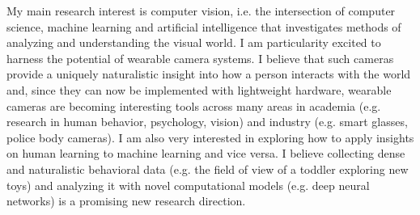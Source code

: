 \documentclass[10pt]{article}
\begin{document}




My main research interest is computer vision, i.e. the intersection of computer science, machine learning and artificial intelligence that investigates methods of analyzing and understanding the visual world.  I am particularity excited to harness the potential of wearable camera systems. I believe that such cameras provide a uniquely naturalistic insight into how a person interacts with the world and, since they can now be implemented with lightweight hardware, wearable cameras are becoming interesting tools across many areas in academia (e.g. research in human behavior, psychology, vision) and industry (e.g. smart glasses, police body cameras). I am also very interested in exploring how to apply insights on human learning to machine learning and vice versa. I believe collecting dense and naturalistic behavioral data (e.g. the field of view of a toddler exploring new toys) and analyzing it with novel computational models (e.g. deep neural networks) is a promising new research direction.
\end{document}

